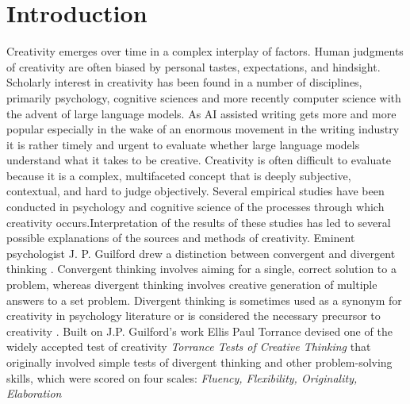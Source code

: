 \section{Introduction}
\label{sec:intro}

Creativity emerges over time in a complex interplay of factors. Human judgments of creativity are often biased by personal tastes, expectations, and hindsight. Scholarly interest in creativity has been found in a number of disciplines, primarily psychology, cognitive sciences and more recently computer science with the advent of large language models. As AI assisted writing gets more and more popular \cite{AIassistedWriting1,AIassistedWriting2} especially in the wake of an enormous movement in the writing industry \cite{WGA} it is rather timely and urgent to evaluate whether large language models understand what it takes to be creative. Creativity is often difficult to evaluate because it is a complex, multifaceted concept that is deeply subjective, contextual, and hard to judge objectively. Several empirical studies have been conducted in psychology and cognitive science of the processes through which creativity occurs.Interpretation of the results of these studies has led to several possible explanations of the sources and methods of creativity. Eminent psychologist J. P. Guilford  drew a distinction between convergent and divergent thinking \cite{guilford1967nature}. Convergent thinking involves aiming for a single, correct solution to a problem, whereas divergent thinking involves creative generation of multiple answers to a set problem. Divergent thinking is sometimes used as a synonym for creativity in psychology literature or is considered the necessary precursor to creativity \cite{RUNCO2011400}. Built on J.P. Guilford's work Ellis Paul Torrance devised one of the widely accepted test of creativity \textit{Torrance Tests of Creative Thinking} \cite{torrance1966torrance} that originally involved simple tests of divergent thinking and other problem-solving skills, which were scored on four scales: \textit{Fluency, Flexibility, Originality, Elaboration}

